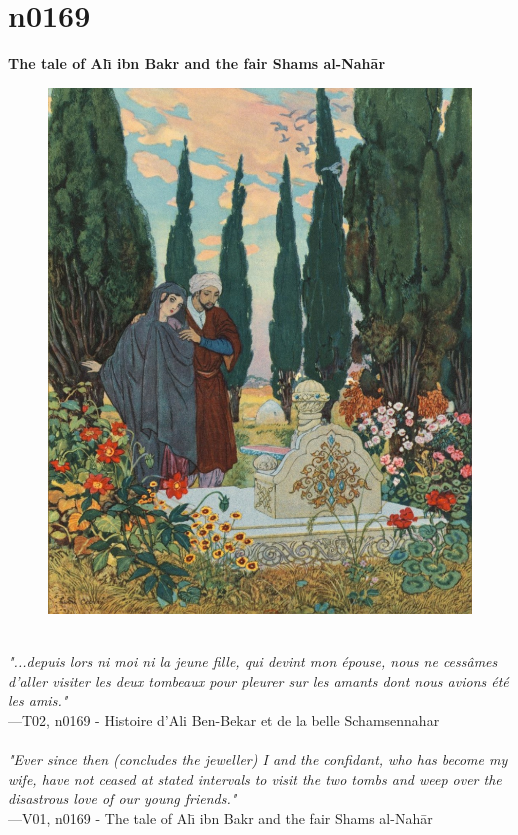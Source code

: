 \documentclass[../Carre_nights.tex]{subfiles}
\begin{document}
\newpage

\section{n0169}
\textbf{\Large{The tale of Al\={\i} ibn Bakr and the fair Shams al-Nah\=ar}} \\

\begin{figure}[ht]
\centering
\includegraphics[height=\figsize]{illustrations/volume_2/T02, n0169 - Histoire d'Ali Ben-Bekar et de la belle Schamsennahar.jpg}
\end{figure}

\textit{\\
"...depuis lors ni moi ni la jeune fille, qui devint mon épouse, nous ne cessâmes d’aller visiter les deux tombeaux pour pleurer sur les amants dont nous avions été les amis."} \\
—T02, n0169 - Histoire d'Ali Ben-Bekar et de la belle Schamsennahar \\~\\
\textit{"Ever since then (concludes the jeweller) I and the confidant, who has become my wife, have not ceased at stated intervals to visit the two tombs and weep over the disastrous love of our young friends."} \\
—V01, n0169 - The tale of Al\={\i} ibn Bakr and the fair Shams al-Nah\=ar
\end{document}
